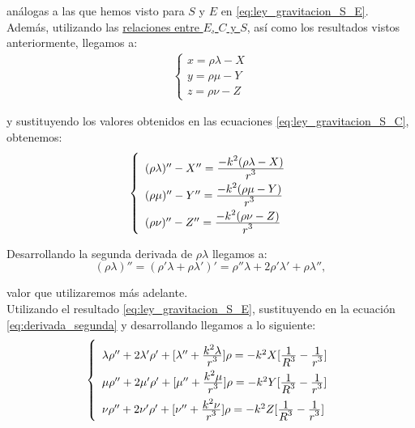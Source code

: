 \documentclass[11pt]{book}
\newcommand\ddfrac[2]{\frac{\displaystyle #1}{\displaystyle #2}}
\begin{document}
\noindent análogas a las que hemos visto para $S$ y $E$ en \eqref{eq:ley_gravitacion_S_E}.\\

Además, utilizando las \hyperref[eq:terminologia]{relaciones entre $E$, $C$ y $S$}, así como los resultados vistos anteriormente, llegamos a:
\begin{align}
\left\{
\begin{array}{l}
	x=\rho\lambda-X\\
	y=\rho\mu-Y\\
	z=\rho\nu-Z
\end{array}
\right.
\label{eq:relacion_C_S_E}
\end{align}

\noindent y sustituyendo los valores obtenidos en las  ecuaciones \eqref{eq:ley_gravitacion_S_C}, obtenemos:
\begin{align}
\left\{
\def\arraystretch{2}
\begin{array}{l}
	(\rho\lambda)'' - X'' = \ddfrac{-k^2(\rho\lambda-X)}{r^3}\\
	(\rho\mu)'' - Y'' = \ddfrac{-k^2(\rho\mu-Y)}{r^3}\\
	(\rho\nu)'' - Z'' = \ddfrac{-k^2(\rho\nu-Z)}{r^3}
\end{array}
\right.
\label{eq:derivada_segunda}
\end{align}

Desarrollando la segunda derivada de $\rho\lambda$ llegamos a:
\[
(\rho\lambda)''=(\rho'\lambda+\rho\lambda')'=\rho''\lambda+2\rho'\lambda'+\rho\lambda'',
\]

\noindent valor que utilizaremos más adelante.\\

Utilizando el resultado \eqref{eq:ley_gravitacion_S_E}, sustituyendo en la ecuación \eqref{eq:derivada_segunda} y desarrollando llegamos a lo siguiente:
\begin{align}
\left\{
\def\arraystretch{2}
\begin{array}{l}
	\lambda\rho''+2\lambda'\rho'+[\lambda''+\ddfrac{k^2\lambda}{r^3}]\rho=-k^2X[\ddfrac{1}{R^3}-\ddfrac{1}{r^3}]\\
	\mu\rho''+2\mu'\rho'+[\mu''+\ddfrac{k^2\mu}{r^3}]\rho=-k^2Y[\ddfrac{1}{R^3}-\ddfrac{1}{r^3}]\\
	\nu\rho''+2\nu'\rho'+[\nu''+\ddfrac{k^2\nu}{r^3}]\rho=-k^2Z[\ddfrac{1}{R^3}-\ddfrac{1}{r^3}]
\end{array}
\right.
\label{eq:fundamental_equations}
\end{align}
\end{document}
